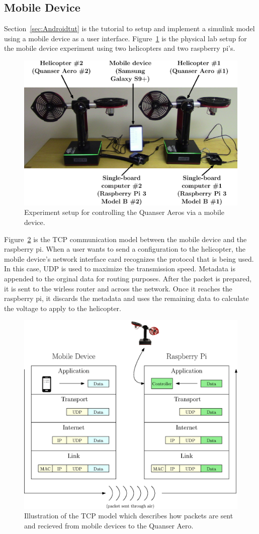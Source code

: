 \subsection{Mobile Device}
Section~\ref{sec:Androidtut} is the tutorial to setup and implement a simulink model using a mobile device as a user interface.  Figure~\ref{fig:Setup} is the physical lab setup for the mobile device experiment using two helicopters and two raspberry pi's. 
\begin{figure}[!htbp]
    \centering
    \includegraphics[width=.5\textwidth,keepaspectratio=true]{figs/ipe/Setup.eps}
    \caption{Experiment setup for controlling the Quanser Aeros via a mobile device.}
    \label{fig:Setup}
\end{figure}
Figure~\ref{fig:TCPModel} is the TCP communication model between the mobile device and the raspberry pi.
When a user wants to send a configuration to the helicopter, the mobile device's network interface card recognizes the protocol that is being used.  In this case, UDP is used to maximize the transmission speed.  Metadata is appended to the orginal data for routing purposes.  After the packet is prepared, it is sent to the wirless router and across the network.  Once it reaches the raspberry pi, it discards the metadata and uses the remaining data to calculate the voltage to apply to the helicopter.
\begin{figure}[!htbp]
    \centering
    \includegraphics[width=.46\textwidth,keepaspectratio=true]{figs/ipe/TCPModel.eps}
    \caption{Illustration of the TCP model which describes how packets are sent and recieved from mobile devices to the Quanser Aero.}
    \label{fig:TCPModel}
\end{figure}
